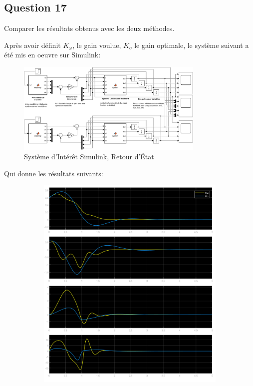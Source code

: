 \documentclass[class=article, crop=false]{standalone}
\begin{document}
\subsection{Question 17}
\begin{exercise}
    Comparer les résultats obtenus avec les deux méthodes.
\end{exercise}
\begin{resolution}
    Après avoir définit $K_{\omega}$, le gain voulue, $K_{o}$ le gain optimale, le système suivant a été mis en oeuvre sur Simulink:
    \begin{figure}[H]
        \centering
        \includegraphics[width=0.8\textwidth]{../images/system_simulink_30.png}
        \caption{Système d'Intérêt Simulink, Retour d'État}
    \end{figure}
    Qui donne les résultats suivants:
    \begin{figure}[H]
        \centering
        \begin{subfigure}[b]{0.475\textwidth}
            \centering
            \includegraphics[width=\textwidth]{../images/simulink_scope30_0_6_02.png}

\end{subfigure}
\end{figure}
\end{resolution}
\end{document}
